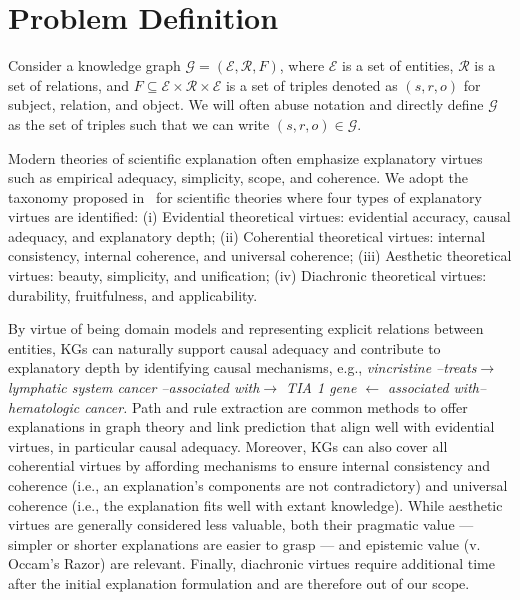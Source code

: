 \documentclass{article}
\theoremstyle{definition}
\newcommand{\G}{\mathcal{G}}
\begin{document}
\section{Problem Definition}
Consider a knowledge graph $\G = (\mathcal{E}, \mathcal{R}, F)$, where $\mathcal{E}$ is a set of entities, $\mathcal{R}$ is a set of relations, and $F \subseteq \mathcal{E} \times \mathcal{R} \times \mathcal{E}$ is a set of triples denoted as $(s,r,o)$ for subject, relation, and object. We will often abuse notation and directly define $\G$ as the set of triples such that we can write $(s,r,o) \in \G$. 


Modern theories of scientific explanation often emphasize explanatory virtues such as empirical adequacy, simplicity, scope, and coherence. We adopt the taxonomy proposed in~\cite{keas2018systematizing} for scientific theories where four types of explanatory virtues are identified: (i) Evidential theoretical virtues: evidential accuracy, causal adequacy, and explanatory depth; (ii) Coherential theoretical virtues: internal consistency, internal coherence, and universal coherence; (iii) Aesthetic theoretical virtues: beauty, simplicity, and unification; (iv) Diachronic theoretical virtues: durability, fruitfulness, and applicability. 


By virtue of being domain models and representing explicit relations between entities, KGs can naturally support causal adequacy and contribute to explanatory depth by identifying causal mechanisms, e.g., \textit{vincristine --treats$\rightarrow$ lymphatic system cancer --associated with$\rightarrow$ TIA 1 gene $\leftarrow$ associated with-- hematologic cancer.} Path and rule extraction are common methods to offer explanations in graph theory and link prediction \cite{meilicke2019anytime,liu2021neural,zhang2023page} that align well with evidential virtues, in particular causal adequacy. Moreover, KGs can also cover all coherential virtues by affording mechanisms to ensure internal consistency and coherence (i.e., an explanation's components are not contradictory) and universal coherence (i.e., the explanation fits well with extant knowledge). While aesthetic virtues are generally considered less valuable, both their pragmatic value --- simpler or shorter explanations are easier to grasp --- and epistemic value (v. Occam's Razor) are relevant. Finally, diachronic virtues require additional time after the initial explanation formulation and are therefore out of our scope.
\end{document}
